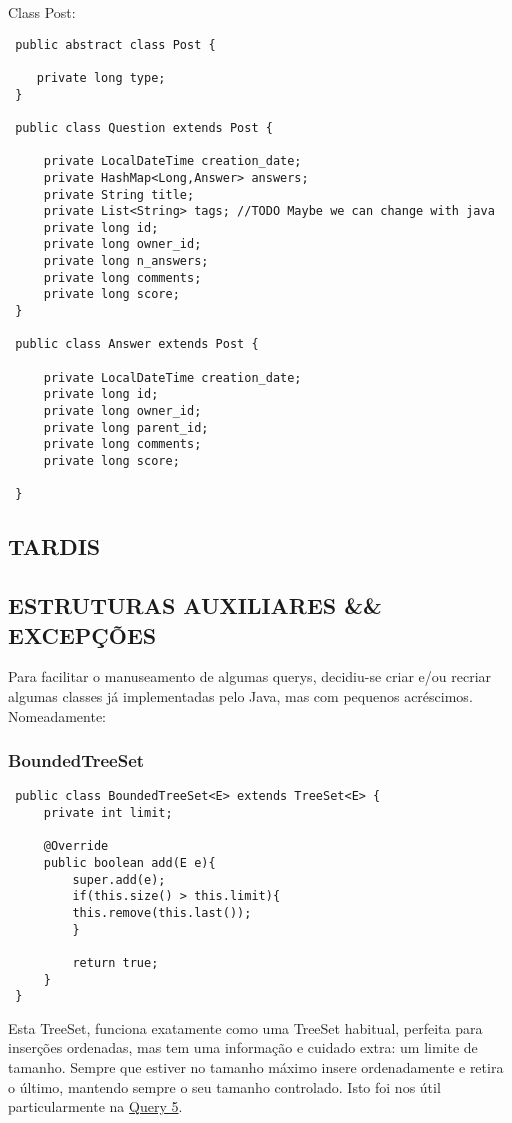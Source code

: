  Class Post:
 \begin{lstlisting}
 public abstract class Post {

    private long type;
 }

 public class Question extends Post {

     private LocalDateTime creation_date;
     private HashMap<Long,Answer> answers;
     private String title;
     private List<String> tags; //TODO Maybe we can change with java
     private long id;
     private long owner_id;
     private long n_answers;
     private long comments;
     private long score;
 }

 public class Answer extends Post {

     private LocalDateTime creation_date;
     private long id;
     private long owner_id;
     private long parent_id;
     private long comments;
     private long score;

 }
 \end{lstlisting}

 \subsection{TARDIS}

 \subsection{ESTRUTURAS AUXILIARES && EXCEPÇÕES}
 Para facilitar o manuseamento de algumas querys, decidiu-se criar e/ou recriar algumas classes já implementadas
 pelo Java, mas com pequenos acréscimos. Nomeadamente:

 \subsubsection{BoundedTreeSet}
 \begin{lstlisting}
 public class BoundedTreeSet<E> extends TreeSet<E> {
     private int limit;

     @Override
     public boolean add(E e){
         super.add(e);
         if(this.size() > this.limit){
         this.remove(this.last());
         }

         return true;
     }
 }
 \end{lstlisting}
 Esta TreeSet, funciona exatamente como uma TreeSet habitual, perfeita para inserções ordenadas, mas tem
 uma informação e cuidado extra: um limite de tamanho. Sempre que estiver no tamanho máximo insere ordenadamente
 e retira o último, mantendo sempre o seu tamanho controlado. Isto foi nos útil particularmente na \underline{Query 5}.
 \newline

